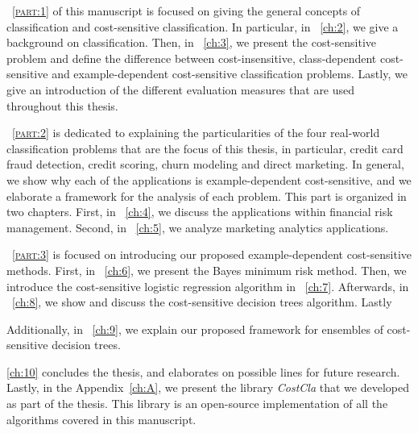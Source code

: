 \partname{~\textsc{\ref{part:1}}} of this manuscript is focused on giving the general concepts of 
classification and cost-sensitive classification. In particular, in \chaptername{~\ref{ch:2}}, we 
give a background on classification. Then, in \chaptername{~\ref{ch:3}}, we present 
the cost-sensitive problem and define the difference between 
cost-insensitive, class-dependent cost-sensitive and example-dependent cost-sensitive 
classification problems. Lastly, we give an introduction of the different evaluation measures 
that are used throughout this thesis.

\partname{~\textsc{\ref{part:2}}} is dedicated to explaining the particularities of the four 
real-world classification problems that are the focus of this thesis, in particular, credit card 
fraud detection, credit scoring, churn modeling and direct marketing. In general, we show why each 
of the applications is example-dependent cost-sensitive, and we elaborate a framework for the 
analysis of each problem. This part is organized in two chapters. First, in 
\chaptername{~\ref{ch:4}}, we discuss the applications within financial risk management. 
Second, in \chaptername{~\ref{ch:5}}, we analyze marketing analytics applications.

\partname{~\textsc{\ref{part:3}}} is focused on introducing our proposed example-dependent 
cost-sensitive methods. First, in \chaptername{~\ref{ch:6}}, we present the Bayes minimum risk 
method. Then, we introduce the cost-sensitive logistic regression algorithm in 
\chaptername{~\ref{ch:7}}. Afterwards, in \chaptername{~\ref{ch:8}}, we show and discuss the 
cost-sensitive decision trees algorithm. Lastly

Additionally, in \chaptername{~\ref{ch:9}}, we 
explain our 
proposed framework for ensembles of cost-sensitive decision trees. 

\chaptername{ \ref{ch:10}} concludes the thesis, and elaborates on possible lines for future 
research. Lastly, in the Appendix~\ref{ch:A}, we present the library \mbox{\textit{CostCla}} that 
we developed as part of the thesis. This library is an open-source implementation of all the 
algorithms covered in this manuscript.
